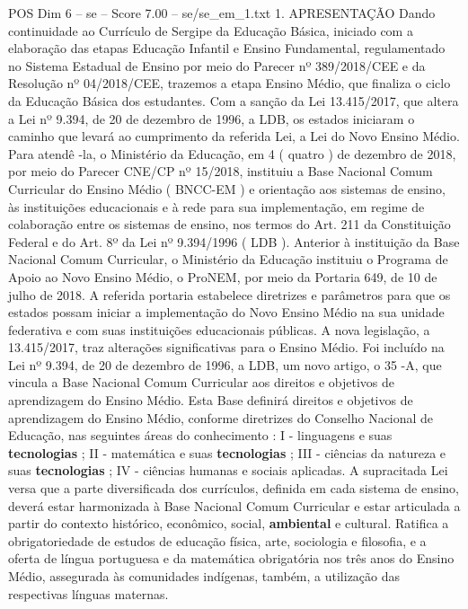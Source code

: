 \begin{textsample}{POS Dim 6 – se – Score 7.00 – se/se\_em\_1.txt}  \label{ex:f6_pos_048}
1.
APRESENTAÇÃO Dando continuidade ao Currículo de Sergipe da Educação Básica, iniciado com a elaboração das etapas Educação Infantil e Ensino Fundamental, regulamentado no Sistema Estadual de Ensino por meio do Parecer nº 389/2018/CEE e da Resolução nº 04/2018/CEE, trazemos a etapa Ensino Médio, que finaliza o ciclo da Educação Básica dos estudantes.
Com a sanção da Lei 13.415/2017, que altera a Lei nº 9.394, de 20 de dezembro de 1996, a LDB, os estados iniciaram o caminho que levará ao cumprimento da referida Lei, a Lei do Novo Ensino Médio.
Para atendê -la, o Ministério da Educação, em 4 ( quatro ) de dezembro de 2018, por meio do Parecer CNE/CP nº 15/2018, instituiu a Base Nacional Comum Curricular do Ensino Médio ( BNCC-EM ) e orientação aos sistemas de ensino, às instituições educacionais e à rede para sua implementação, em regime de colaboração entre os sistemas de ensino, nos termos do Art. 211 da Constituição Federal e do Art. 8º da Lei nº 9.394/1996 ( LDB ).
Anterior à instituição da Base Nacional Comum Curricular, o Ministério da Educação instituiu o Programa de Apoio ao Novo Ensino Médio, o ProNEM, por meio da Portaria 649, de 10 de julho de 2018.
A referida portaria estabelece diretrizes e parâmetros para que os estados possam iniciar a implementação do Novo Ensino Médio na sua unidade federativa e com suas instituições educacionais públicas.
A nova legislação, a 13.415/2017, traz alterações significativas para o Ensino Médio.
Foi incluído na Lei nº 9.394, de 20 de dezembro de 1996, a LDB, um novo artigo, o 35 -A, que vincula a Base Nacional Comum Curricular aos direitos e objetivos de aprendizagem do Ensino Médio.
Esta Base definirá direitos e objetivos de aprendizagem do Ensino Médio, conforme diretrizes do Conselho Nacional de Educação, nas seguintes áreas do conhecimento : I - linguagens e suas \textbf{tecnologias} ; II - matemática e suas \textbf{tecnologias} ; III - ciências da natureza e suas \textbf{tecnologias} ; IV - ciências humanas e sociais aplicadas.
A supracitada Lei versa que a parte diversificada dos currículos, definida em cada sistema de ensino, deverá estar harmonizada à Base Nacional Comum Curricular e estar articulada a partir do contexto histórico, econômico, social, \textbf{ambiental} e cultural.
Ratifica a obrigatoriedade de estudos de educação física, arte, sociologia e filosofia, e a oferta de língua portuguesa e da matemática obrigatória nos três anos do Ensino Médio, assegurada às comunidades indígenas, também, a utilização das respectivas línguas maternas.

\end{textsample}
